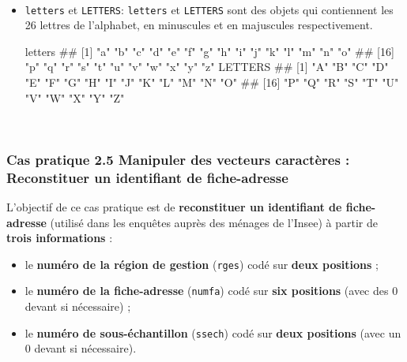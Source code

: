 \documentclass[12pt,twosided, notitlepage]{book}
\newenvironment{Shaded}{}{}
\newcommand{\NormalTok}[1]{#1}
\providecommand{\tightlist}{%
  \setlength{\itemsep}{0pt}\setlength{\parskip}{0pt}}
\renewenvironment{Shaded}{\begin{snugshade}}{\end{snugshade}}
\begin{document}
~

\begin{itemize}
\item
  \texttt{letters} et \texttt{LETTERS}: \texttt{letters} et
  \texttt{LETTERS} sont des objets qui contiennent les 26 lettres de
  l'alphabet, en minuscules et en majuscules respectivement.

\begin{Shaded}
\begin{Highlighting}[]
\NormalTok{letters}
\NormalTok{  ##  [1] "a" "b" "c" "d" "e" "f" "g" "h" "i" "j" "k" "l" "m" "n" "o"}
\NormalTok{  ## [16] "p" "q" "r" "s" "t" "u" "v" "w" "x" "y" "z"}
\NormalTok{LETTERS}
\NormalTok{  ##  [1] "A" "B" "C" "D" "E" "F" "G" "H" "I" "J" "K" "L" "M" "N" "O"}
\NormalTok{  ## [16] "P" "Q" "R" "S" "T" "U" "V" "W" "X" "Y" "Z"}
\end{Highlighting}
\end{Shaded}
\end{itemize}

~

\hypertarget{cas-pratique-2.5-manipuler-des-vecteurs-caracteres-reconstituer-un-identifiant-de-fiche-adresse}{%
\subsubsection{\texorpdfstring{\textbf{Cas pratique 2.5} Manipuler des
vecteurs caractères : Reconstituer un identifiant de
fiche-adresse}{Cas pratique 2.5 Manipuler des vecteurs caractères : Reconstituer un identifiant de fiche-adresse}}\label{cas-pratique-2.5-manipuler-des-vecteurs-caracteres-reconstituer-un-identifiant-de-fiche-adresse}}


L'objectif de ce cas pratique est de \textbf{reconstituer un identifiant
de fiche-adresse} (utilisé dans les enquêtes auprès des ménages de
l'Insee) à partir de \textbf{trois informations} :

\begin{itemize}
\tightlist
\item
  le \textbf{numéro de la région de gestion} (\texttt{rges}) codé sur
  \textbf{deux positions} ;
\item
  le \textbf{numéro de la fiche-adresse} (\texttt{numfa}) codé sur
  \textbf{six positions} (avec des 0 devant si nécessaire) ;
\item
  le \textbf{numéro de sous-échantillon} (\texttt{ssech}) codé sur
  \textbf{deux positions} (avec un 0 devant si nécessaire).
\end{itemize}
\end{document}
